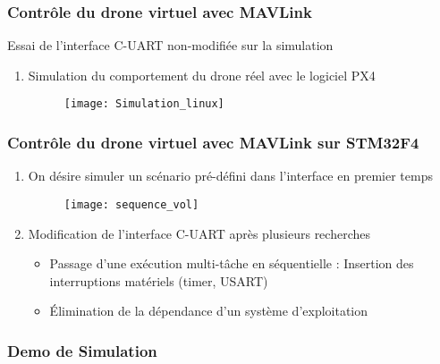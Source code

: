 \documentclass{beamer}
\begin{document}
\begin{frame}
\frametitle{Contr\^ole du drone virtuel avec MAVLink}

Essai de l'interface C-UART non-modifi\'ee sur la simulation

\begin{enumerate}

\item Simulation du comportement du drone r\'eel avec le logiciel PX4
	\begin{figure}
	
		\texttt{[image: Simulation\_linux]}
	
	\end{figure}

\end{enumerate}

\end{frame}


\begin{frame}
\frametitle{Contr\^ole du drone virtuel avec MAVLink sur STM32F4}

\begin{enumerate}

\item On d\'esire simuler un sc\'enario pr\'e-d\'efini dans l'interface en premier temps
	\begin{figure}
	
		\texttt{[image: sequence\_vol]}
	
	\end{figure}

\item Modification de l'interface C-UART apr\`es plusieurs recherches
	  \begin{itemize}
		\item Passage d'une ex\'ecution multi-t\^ache en s\'equentielle : Insertion des interruptions mat\'eriels (timer, USART)
		\item \'Elimination de la d\'ependance d'un syst\`eme d'exploitation
	   \end{itemize}

\end{enumerate}

\end{frame}


\begin{frame}
	
	\frametitle{Demo de Simulation}


\end{frame}
\end{document}
